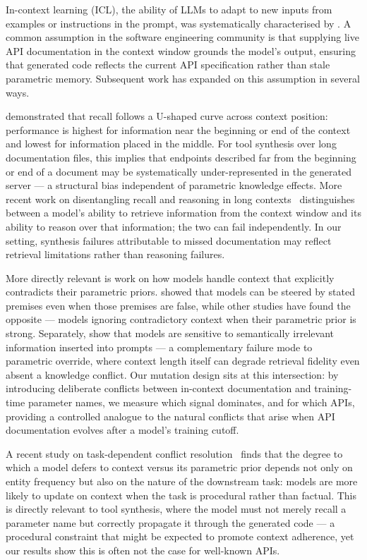 In-context learning (ICL), the ability of LLMs to adapt to new inputs from examples or instructions in the prompt, was systematically characterised by \citet{brown2020gpt3}. A common assumption in the software engineering community is that supplying live API documentation in the context window grounds the model's output, ensuring that generated code reflects the current API specification rather than stale parametric memory. Subsequent work has expanded on this assumption in several ways.

\citet{liu2023lostmiddle} demonstrated that recall follows a U-shaped curve across context position: performance is highest for information near the beginning or end of the context and lowest for information placed in the middle. For tool synthesis over long documentation files, this implies that endpoints described far from the beginning or end of a document may be systematically under-represented in the generated server --- a structural bias independent of parametric knowledge effects. More recent work on disentangling recall and reasoning in long contexts~\citep{disentanglerecall2025} distinguishes between a model's ability to retrieve information from the context window and its ability to reason over that information; the two can fail independently. In our setting, synthesis failures attributable to missed documentation may reflect retrieval limitations rather than reasoning failures.

More directly relevant is work on how models handle context that explicitly contradicts their parametric priors. \citet{xie2023adaptive} showed that models can be steered by stated premises even when those premises are false, while other studies have found the opposite --- models ignoring contradictory context when their parametric prior is strong. Separately, \citet{shi2023distractors} show that models are sensitive to semantically irrelevant information inserted into prompts --- a complementary failure mode to parametric override, where context length itself can degrade retrieval fidelity even absent a knowledge conflict. Our mutation design sits at this intersection: by introducing deliberate conflicts between in-context documentation and training-time parameter names, we measure which signal dominates, and for which APIs, providing a controlled analogue to the natural conflicts that arise when API documentation evolves after a model's training cutoff.

A recent study on task-dependent conflict resolution~\citep{taskmatters2025} finds that the degree to which a model defers to context versus its parametric prior depends not only on entity frequency but also on the nature of the downstream task: models are more likely to update on context when the task is procedural rather than factual. This is directly relevant to tool synthesis, where the model must not merely recall a parameter name but correctly propagate it through the generated code --- a procedural constraint that might be expected to promote context adherence, yet our results show this is often not the case for well-known APIs.

